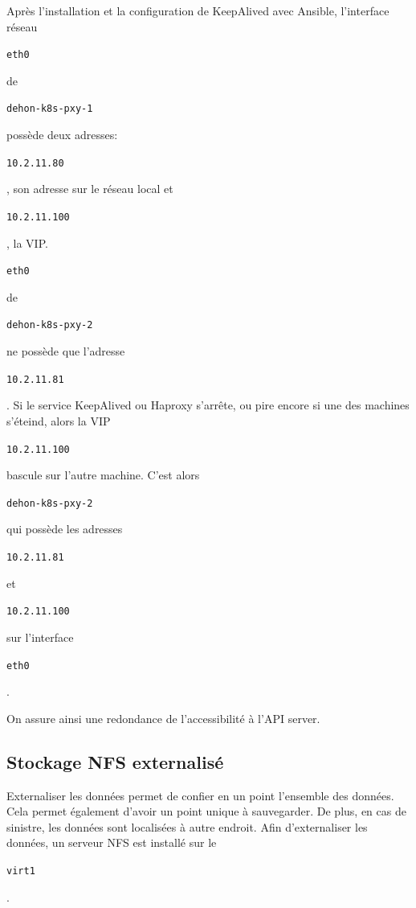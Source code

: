 \documentclass[12pt, a4paper, twoside]{article}
\begin{document}
Après l'installation et la configuration de KeepAlived avec \gls{Ansible}, l'interface réseau \begin{code}\texttt{eth0}\end{code} de \begin{code}\texttt{dehon-k8s-pxy-1}\end{code} possède deux adresses: \begin{code}\texttt{10.2.11.80}\end{code}, son adresse sur le réseau local et \begin{code}\texttt{10.2.11.100}\end{code}, la \gls{VIP}.
\begin{code}\texttt{eth0}\end{code} de \begin{code}\texttt{dehon-k8s-pxy-2}\end{code} ne possède que l'adresse \begin{code}\texttt{10.2.11.81}\end{code}.
Si le service KeepAlived ou Haproxy s'arrête, ou pire encore si une des machines s'éteind, alors la \gls{VIP} \begin{code}\texttt{10.2.11.100}\end{code} bascule sur l'autre machine.
C'est alors \begin{code}\texttt{dehon-k8s-pxy-2}\end{code} qui possède les adresses \begin{code}\texttt{10.2.11.81}\end{code} et \begin{code}\texttt{10.2.11.100}\end{code} sur l'interface \begin{code}\texttt{eth0}\end{code}.

On assure ainsi une redondance de l'accessibilité à l'\gls{API} server.

\newpage
\subsection{Stockage NFS externalisé}
Externaliser les données permet de confier en un point l'ensemble des données.
Cela permet également d'avoir un point unique à sauvegarder.
De plus, en cas de sinistre, les données sont localisées à autre endroit.
Afin d'externaliser les données, un serveur NFS est installé sur le \begin{code}\texttt{virt1}\end{code}.
\end{document}
